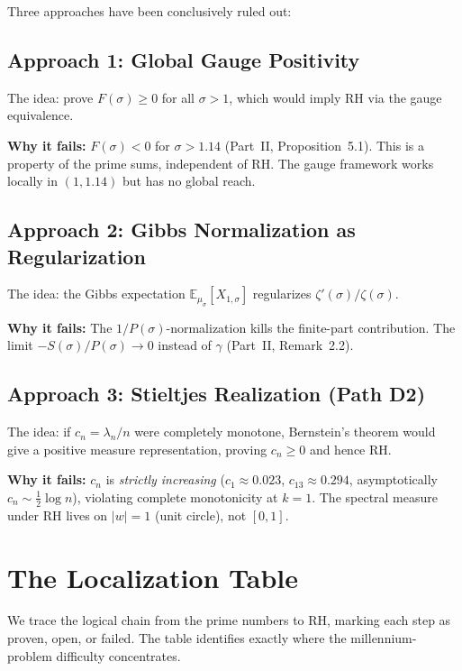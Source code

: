 \documentclass[12pt,a4paper]{article}
\theoremstyle{definition}
\theoremstyle{remark}
\newcommand{\EE}{\mathbb{E}}
\newcommand{\muG}{\mu_\sigma}
\begin{document}
Three approaches have been conclusively ruled out:

\subsection{Approach 1: Global Gauge Positivity}

The idea: prove $F(\sigma) \geq 0$ for all $\sigma > 1$, which would imply RH via the gauge equivalence.

\textbf{Why it fails:} $F(\sigma) < 0$ for $\sigma > 1.14$ (Part~II, Proposition~5.1). This is a property of the prime sums, independent of RH. The gauge framework works locally in $(1, 1.14)$ but has no global reach.

\subsection{Approach 2: Gibbs Normalization as Regularization}

The idea: the Gibbs expectation $\EE_{\muG}[X_{1,\sigma}]$ regularizes $\zeta'(\sigma)/\zeta(\sigma)$.

\textbf{Why it fails:} The $1/P(\sigma)$-normalization kills the finite-part contribution. The limit $-S(\sigma)/P(\sigma) \to 0$ instead of $\gamma$ (Part~II, Remark~2.2).

\subsection{Approach 3: Stieltjes Realization (Path D2)}

The idea: if $c_n = \lambda_n/n$ were completely monotone, Bernstein's theorem would give a positive measure representation, proving $c_n \geq 0$ and hence RH.

\textbf{Why it fails:} $c_n$ is \emph{strictly increasing} ($c_1 \approx 0.023$, $c_{13} \approx 0.294$, asymptotically $c_n \sim \frac{1}{2}\log n$), violating complete monotonicity at $k=1$. The spectral measure under RH lives on $|w| = 1$ (unit circle), not $[0,1]$.


\section{The Localization Table}
\label{sec:localization}

We trace the logical chain from the prime numbers to RH, marking each step as proven, open, or failed. The table identifies exactly where the millennium-problem difficulty concentrates.
\end{document}
